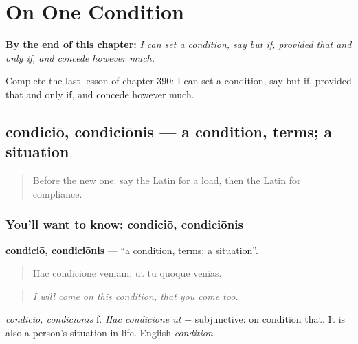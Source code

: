 
\chapter{On One Condition}
\label{ch:la-on-one-condition}

\begin{chapteropening}
\textbf{By the end of this chapter:} \emph{I can set a condition, say but if, provided that and only if, and concede however much.}

Complete the last lesson of chapter 390: I can set a condition, say but if, provided that and only if, and concede however much.
\end{chapteropening}

\section[condiciō, condiciōnis]{condiciō, condiciōnis — a condition, terms; a situation}

\label{lesson:LA-C390-condicio}



\begin{quote}
Before the new one: say the Latin for a load, then the Latin for compliance.
\end{quote}

\subsection*{You'll want to know: condiciō, condiciōnis}
\textbf{condiciō, condiciōnis} — \textquotedblleft{}a condition, terms; a situation\textquotedblright{}.

\begin{quote}
Hāc condiciōne veniam, ut tū quoque veniās.
\end{quote}

\begin{quote}
\emph{I will come on this condition, that you come too.}
\end{quote}

\emph{condiciō, condiciōnis} f. \emph{Hāc condiciōne ut} + subjunctive: on condition that. It is also a person's situation in life. English \emph{condition}.

